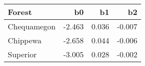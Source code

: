 \begin{table}[ht]
\begin{center}
\begin{tabular}{lrrr}
  \hline
Forest & b0 & b1 & b2 \\ 
  \hline
Chequamegon & -2.463 & 0.036 & -0.007 \\ 
  Chippewa & -2.658 & 0.044 & -0.006 \\ 
  Superior & -3.005 & 0.028 & -0.002 \\ 
   \hline
\end{tabular}
\end{center}
\end{table}
